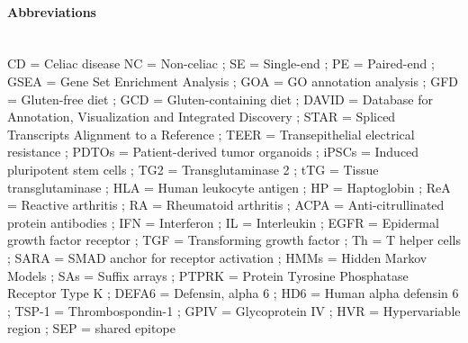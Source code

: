 \documentclass[12pt]{article}
\begin{document}
\paragraph{\large \textbf{Abbreviations}}\mbox{} \\

\noindent CD = Celiac disease
NC = Non-celiac ; SE = Single-end ; PE = Paired-end ; GSEA = Gene Set Enrichment Analysis ; GOA = GO annotation analysis ; GFD = Gluten-free diet ; GCD = Gluten-containing diet ; 
DAVID = Database for Annotation, Visualization and Integrated Discovery ; STAR = Spliced Transcripts Alignment to a Reference ; 
TEER = Transepithelial electrical resistance ; PDTOs = Patient-derived tumor organoids ; iPSCs = Induced pluripotent stem cells ; 
TG2 = Transglutaminase 2 ; tTG = Tissue transglutaminase ; HLA = Human leukocyte antigen ; HP = Haptoglobin ; ReA = Reactive arthritis ; RA = Rheumatoid arthritis ; ACPA = Anti-citrullinated protein antibodies ; IFN = Interferon ; IL = Interleukin ; 
EGFR = Epidermal growth factor receptor ; TGF = Transforming growth factor ; Th = T helper cells ; 
SARA = SMAD anchor for receptor activation ; HMMs = Hidden Markov Models ; SAs = Suffix arrays ; 
PTPRK = Protein Tyrosine Phosphatase Receptor Type K ; DEFA6 = Defensin, alpha 6 ; HD6 = Human alpha defensin 6 ; 
TSP-1 = Thrombospondin-1 ; GPIV = Glycoprotein IV ; HVR = Hypervariable region ; SEP = shared epitope
\end{document}
